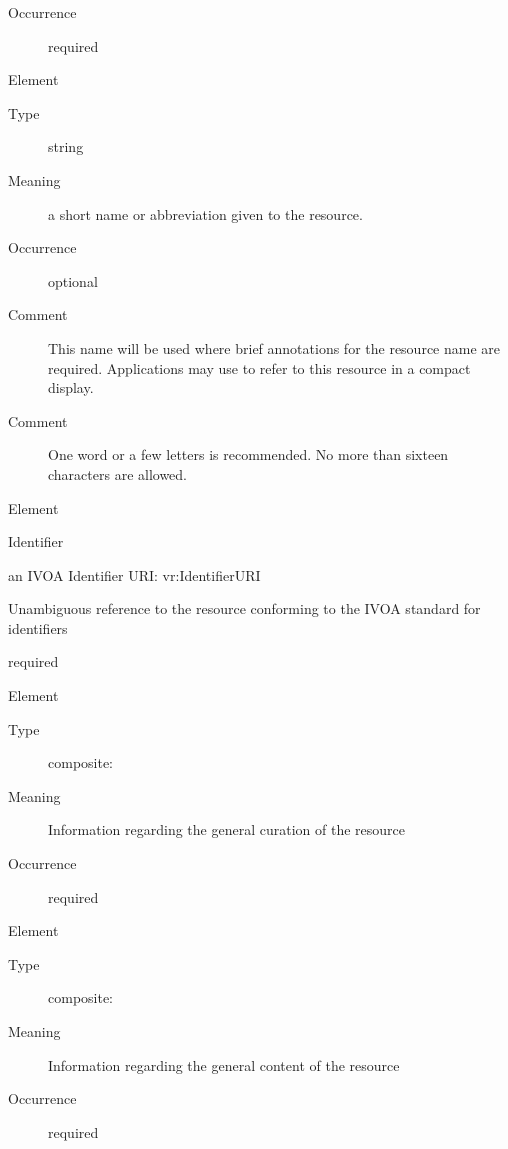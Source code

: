 \documentclass[11pt,a4paper]{ivoa}
\begin{document}
\begin{bigdescription}
\begin{description}
\item[Occurrence] required

\end{description}
\item[Element \xmlel{shortName}]
\begin{description}
\item[Type] string
\item[Meaning] 
                 a short name or abbreviation given to the resource.
               
\item[Occurrence] optional

\item[Comment] 
                 This name will be used where brief annotations for
                 the resource name are required.  Applications may 
                 use to refer to this resource in a compact display.   
               
\item[Comment] 
                 One word or a few letters is recommended.  No more
                 than sixteen characters are allowed.
               

\end{description}
\item[Element \xmlel{identifier}]
\begin{description}
Identifier
\item[Type] an IVOA Identifier URI: vr:IdentifierURI
\item[Meaning] 
                 Unambiguous reference to the resource conforming to the IVOA
                 standard for identifiers
               
\item[Occurrence] required


\end{description}
\item[Element \xmlel{curation}]
\begin{description}
\item[Type] composite: 
\item[Meaning] 
               Information regarding the general curation of the resource
             
\item[Occurrence] required

\end{description}
\item[Element \xmlel{content}]
\begin{description}
\item[Type] composite: 
\item[Meaning] 
               Information regarding the general content of the resource
             
\item[Occurrence] required

\end{description}


\end{bigdescription}\endgroup
\end{document}
